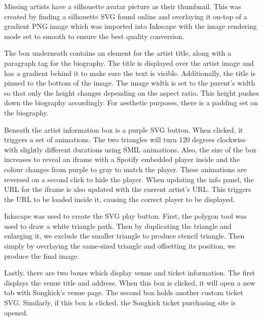\documentclass[10pt]{article}
\begin{document}
                Missing artists have a silhouette avatar picture as their thumbnail. This was created by finding a silhouette SVG found online and overlaying it on-top of a gradient PNG image which was imported into Inkscape with the image rendering mode set to smooth to ensure the best quality conversion. 

                The box underneath contains an element for the artist title, along with a paragraph tag for the biography. The title is displayed over the artist image and has a gradient behind it to make sure the text is visible. Additionally, the title is pinned to the bottom of the image. The image width is set to the parent's width so that only the height changes depending on the aspect ratio. This height pushes down the biography accordingly. For aesthetic purposes, there is a padding set on the biography.

                Beneath the artist information box is a purple SVG button. When clicked, it triggers a set of animations. The two triangles will turn 120 degrees clockwise with slightly different durations using SMIL animations. Also, the size of the box increases to reveal an iframe with a Spotify embedded player inside and the colour changes from purple to gray to match the player. These animations are reversed on a second click to hide the player. When updating the info panel, the URL for the iframe is also updated with the current artist's URL. This triggers the URL to be loaded inside it, causing the correct player to be displayed.

                Inkscape was used to create the SVG play button. First, the polygon tool was used to draw a white triangle path. Then by duplicating the triangle and enlarging it, we exclude the smaller triangle to produce stencil triangle. Then simply by overlaying the same-sized triangle and offsetting its position, we produce the final image.

                Lastly, there are two boxes which display venue and ticket information. The first displays the venue title and address. When this box is clicked, it will open a new tab with Songkick's venue page. The second box holds another custom ticket SVG. Similarly, if this box is clicked, the Songkick ticket purchasing site is opened.
\end{document}
